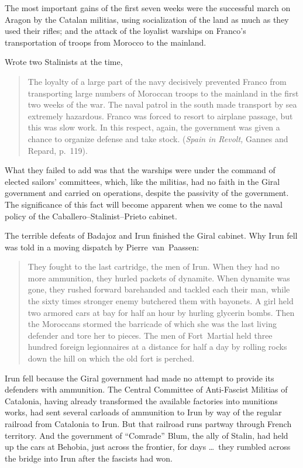 The most important gains of the first seven weeks were the successful march on Aragon by the Catalan militias, using socialization of the land as much as they used their rifles; and the attack of the loyalist warships on Franco’s transportation of troops from Morocco to the mainland.

\medskip

Wrote two Stalinists at the time,

\begin{quotation}
  The loyalty of a large part of the navy decisively prevented Franco from transporting large numbers of Moroccan troops to the mainland in the first two weeks of the war. The naval patrol in the south made transport by sea extremely hazardous. Franco was forced to resort to airplane passage, but this was slow work. In this respect, again, the government was given a chance to organize defense and take stock. (\emph{Spain in Revolt,} Gannes and Repard, p.~119).
\end{quotation}

What they failed to add was that the warships were under the command of elected sailors’ committees, which, like the militias, had no faith in the Giral government and carried on operations, despite the passivity of the government. The significance of this fact will become apparent when we come to the naval policy of the Caballero--Stalinist--Prieto cabinet.

The terrible defeats of Badajoz and Irun finished the Giral cabinet. Why Irun fell was told in a moving dispatch by Pierre~van~Paassen:

\begin{quotation}
  They fought to the last cartridge, the men of Irun. When they had no more ammunition, they hurled packets of dynamite. When dynamite was gone, they rushed forward barehanded and tackled each their man, while the sixty times stronger enemy butchered them with bayonets. A girl held two armored cars at bay for half an hour by hurling glycerin bombs. Then the Moroccans stormed the barricade of which she was the last living defender and tore her to pieces. The men of Fort~Martial held three hundred foreign legionnaires at a distance for half a day by rolling rocks down the hill on which the old fort is perched.
\end{quotation}

Irun fell because the Giral government had made no attempt to provide its defenders with ammunition. The Central Committee of Anti-Fascist Militias of Catalonia, having already transformed the available factories into munitions works, had sent several carloads of ammunition to Irun by way of the regular railroad from Catalonia to Irun. But that railroad runs partway through French territory. And the government of ``Comrade'' Blum, the ally of Stalin, had held up the cars at Behobia, just across the frontier\kn, for days \dots\ they rumbled across the bridge into Irun after the fascists had won.

